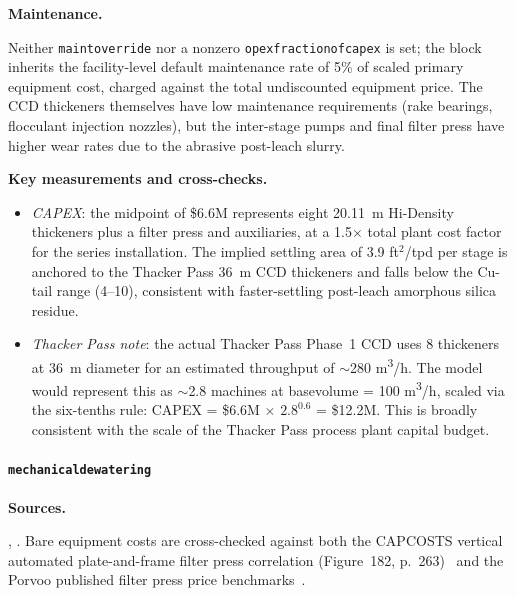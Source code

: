 \documentclass{article}
\renewcommand\_{\textunderscore\allowbreak}
\begin{document}
\medskip
\noindent\textbf{Maintenance.}\quad

Neither \texttt{maint\_override} nor a nonzero \texttt{opex\_fraction\_of\_capex} is set; the block inherits the facility-level default maintenance rate of 5\% of scaled primary equipment cost, charged against the total undiscounted equipment price. The CCD thickeners themselves have low maintenance requirements (rake bearings, flocculant injection nozzles), but the inter-stage pumps and final filter press have higher wear rates due to the abrasive post-leach slurry.

\medskip
\noindent\textbf{Key measurements and cross-checks.}\quad

\begin{itemize}[noitemsep]
	\item \textit{CAPEX}: the midpoint of \$6.6M represents eight 20.11~m Hi-Density thickeners plus a filter press and auxiliaries, at a 1.5$\times$ total plant cost factor for the series installation. The implied settling area of 3.9 ft$^2$/tpd per stage is anchored to the Thacker Pass 36~m CCD thickeners and falls below the Cu-tail range (4--10), consistent with faster-settling post-leach amorphous silica residue.
	\item \textit{Thacker Pass note}: the actual Thacker Pass Phase~1 CCD uses 8 thickeners at 36~m diameter for an estimated throughput of $\sim$280 \si{m^3/h}. The model would represent this as $\sim$2.8 machines at base\_volume = 100 \si{m^3/h}, scaled via the six-tenths rule: CAPEX = \$6.6M $\times$ $2.8^{0.6}$ = \$12.2M. This is broadly consistent with the scale of the Thacker Pass process plant capital budget.
\end{itemize}

\clearpage
\paragraph{\texttt{mechanical\_dewatering}}\label{app:04-methods-blockdefs-dewater}\leavevmode\par

\medskip
\noindent\textbf{Sources.}\quad

\citet{mularCAPCOSTSHandbookEstimating1998}, \citet{porvooIndustrialFilterPress2025}. Bare equipment costs are cross-checked against both the CAPCOSTS vertical automated plate-and-frame filter press correlation (Figure~182, p.~263)~\citep{mularCAPCOSTSHandbookEstimating1998} and the Porvoo published filter press price benchmarks~\citep{porvooIndustrialFilterPress2025}.
\end{document}
